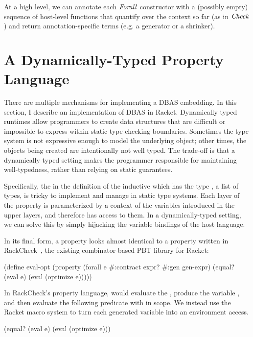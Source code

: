 At a high level, we can annotate each $\mathit{Forall}$ constructor with a (possibly empty)
sequence of host-level functions that quantify over the context so far (as in
$\mathit{Check}$) and return annotation-specific terms (e.g. a generator or a shrinker).

\section{A Dynamically-Typed Property Language}\label{sec:racket}

There are multiple mechanisms for implementing a DBAS embedding. In this section, I
describe an implementation of DBAS in Racket. Dynamically typed runtimes allow
programmers to create data structures that are difficult or impossible to express
within static type-checking boundaries. Sometimes the type system is not expressive
enough to model the underlying object; other times, the objects being created are
intentionally not well typed. The trade-off is that a dynamically typed setting makes
the programmer responsible for maintaining well-typedness, rather than relying on
static guarantees.

Specifically, the  in the definition of the inductive  which has
the type \code{[Type]}, a list of types, is tricky to implement and manage in static
type systems. Each layer of the property is parameterized by a context of the variables
introduced in the upper layers, and therefore has access to them. In a
dynamically-typed setting, we can solve this by simply hijacking the variable bindings
of the host language.

In its final form, a property looks almost identical to a property written in
RackCheck~\cite{rackcheck}, the existing combinator-based PBT library for Racket:

\begin{code}[language=Racket]
(define eval-opt
  (property
    (forall e #:contract expr? #:gen gen-expr)
    (equal? (eval e) (eval (optimize e)))))
\end{code}

In RackCheck's property language,  would evaluate the ,
produce the variable , and then evaluate the following predicate with 
in scope. We instead use the Racket macro system to turn each generated variable into
an environment access.

\begin{code}[language=Racket]
(equal? (eval e) (eval (optimize e)))
\end{code}


